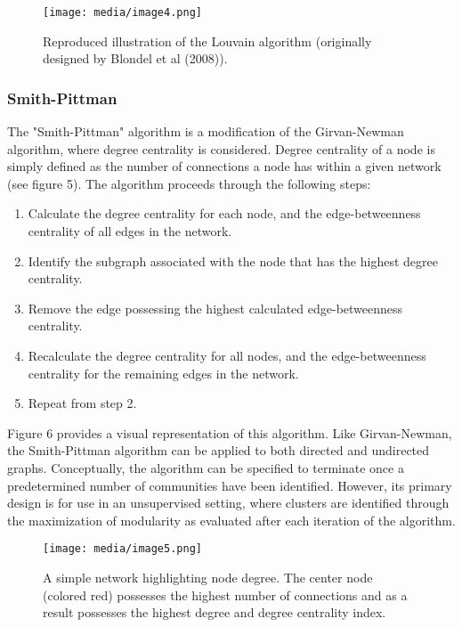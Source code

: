 \documentclass{article}
\begin{document}
\begin{figure}
\centering
\texttt{[image: media/image4.png]}

\caption{Reproduced illustration of the Louvain algorithm
(originally designed by Blondel et al (2008)).}
\end{figure}

\subsubsection{Smith-Pittman}\label{smith-pittman}

The "Smith-Pittman" algorithm is a modification of the Girvan-Newman
algorithm, where degree centrality is considered. Degree centrality of a
node is simply defined as the number of connections a node has within a
given network (see figure 5). The algorithm proceeds through the
following steps:

\begin{enumerate}
\def\labelenumi{\arabic{enumi}.}
\item
  Calculate the degree centrality for each node, and the edge-betweenness
  centrality of all edges in the network.
\item
  Identify the subgraph associated with the node that has the highest
  degree centrality.
\item
  Remove the edge possessing the highest calculated edge-betweenness
  centrality.
\item
  Recalculate the degree centrality for all nodes, and the
  edge-betweenness centrality for the remaining edges in the network.
\item
  Repeat from step 2.
\end{enumerate}

Figure 6 provides a visual representation of this algorithm. Like
Girvan-Newman, the Smith-Pittman algorithm can be applied to both directed
and undirected graphs. Conceptually, the algorithm can be specified to
terminate once a predetermined number of communities have been
identified. However, its primary design is for use in an unsupervised
setting, where clusters are identified through the maximization of
modularity as evaluated after each iteration of the algorithm.

\begin{figure}
\centering
\texttt{[image: media/image5.png]}
\caption{A simple network highlighting node degree.
The center node (colored red) possesses the highest number of connections
and as a result possesses the highest degree and degree centrality
index.}
\end{figure}
\end{document}
